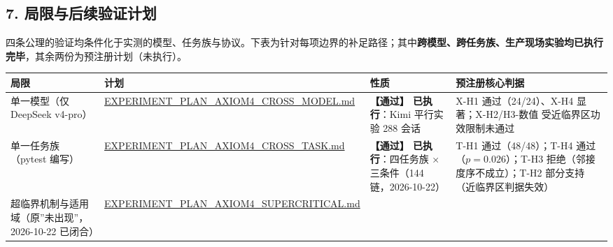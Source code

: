 \subsection{7.
局限与后续验证计划}\label{ux5c40ux9650ux4e0eux540eux7eedux9a8cux8bc1ux8ba1ux5212}

四条公理的验证均条件化于实测的模型、任务族与协议。下表为针对每项边界的补足路径；其中\textbf{跨模型、跨任务族、生产现场实验均已执行完毕}，其余两份为预注册计划（未执行）。

{\def\LTcaptype{} %
\begin{longtable}[]{@{}
  >{\raggedright\arraybackslash}p{}
  >{\raggedright\arraybackslash}p{}
  >{\raggedright\arraybackslash}p{}
  >{\raggedright\arraybackslash}p{}@{}}
\toprule\noalign{}
\begin{minipage}[b]{\linewidth}\raggedright
局限
\end{minipage} & \begin{minipage}[b]{\linewidth}\raggedright
计划
\end{minipage} & \begin{minipage}[b]{\linewidth}\raggedright
性质
\end{minipage} & \begin{minipage}[b]{\linewidth}\raggedright
预注册核心判据
\end{minipage} \\
\midrule\noalign{}
\endhead
\bottomrule\noalign{}
\endlastfoot
单一模型（仅 DeepSeek v4-pro） &
\href{file:///e:/workspace/industrial-agentic-cybernetics/experiments/attention_growth/EXPERIMENT_PLAN_AXIOM4_CROSS_MODEL.md}{EXPERIMENT\_PLAN\_AXIOM4\_CROSS\_MODEL.md}
& \textbf{【通过】 已执行}：Kimi 平行实验 288 会话 & X-H1
通过（24/24）、X-H4 显著；X-H2/H3-数值 受近临界区功效限制未通过 \\
单一任务族（pytest 编写） &
\href{file:///e:/workspace/industrial-agentic-cybernetics/experiments/attention_growth/EXPERIMENT_PLAN_AXIOM4_CROSS_TASK.md}{EXPERIMENT\_PLAN\_AXIOM4\_CROSS\_TASK.md}
& \textbf{【通过】 已执行}：四任务族 × 三条件（144 链，2026-10-22） &
T-H1 通过（48/48）；T-H4 通过（\(p=0.026\)）；T-H3
拒绝（邻接度序不成立）；T-H2 部分支持（近临界区判据失效） \\
超临界机制与适用域（原''未出现''，2026-10-22 已闭合） &
\href{file:///e:/workspace/industrial-agentic-cybernetics/experiments/attention_growth/EXPERIMENT_PLAN_AXIOM4_SUPERCRITICAL.md}{EXPERIMENT\_PLAN\_AXIOM4\_SUPERCRITICAL.md}

\end{longtable}}
